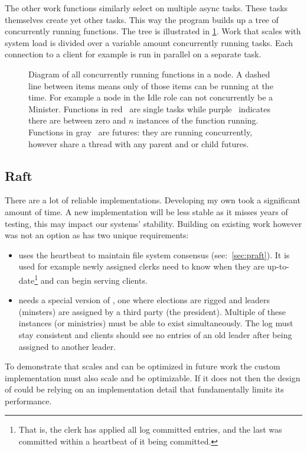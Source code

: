 The other work functions similarly select on multiple async tasks. These tasks themselves create yet other tasks. This way the program builds up a tree of concurrently running functions. The tree is illustrated in \cref{fig:tree}. Work that scales with system load is divided over a variable amount concurrently running tasks. Each connection to a client for example is run in parallel on a separate task.
%
\clearpage
\thispagestyle{empty}
\begin{figure}[htbp]
	\centering
	
	\caption{Diagram of all concurrently running functions in a node. A dashed line between items means only of those items can be running at the time. For example a node in the Idle role can not concurrently be a Minister. Functions in red~\taskLeg{} are single tasks while purple~\tasksLeg{} indicates there are between zero and $n$ instances of the function running. Functions in gray~\futureLeg{} are futures: they are running concurrently, however share a thread with any parent and or child futures.}
	\label{fig:tree}
\end{figure}
\clearpage

\subsection{Raft}
There are a lot of reliable \raft{} implementations. Developing my own took a significant amount of time. A new implementation will be less stable as it misses years of testing, this may impact our systems' stability. Building on existing work however was not an option as \name{} has two unique requirements: 
%
\begin{itemize}
	\item \Name{} uses the \raft{} heartbeat to maintain file system consensus (see:~\cref{sec:praft}). It is used for example newly assigned clerks need to know when they are up-to-date\footnote{That is, the clerk has applied all log committed entries, and the last was committed within a \raft{} heartbeat of it being committed.} and can begin serving clients. 
	\item \Name{} needs a special version of \raft{}, one where elections are rigged and leaders (minsters) are assigned by a third party (the president). Multiple of these instances (or ministries) must be able to exist simultaneously. The log must stay consistent and clients should see no entries of an old leader after being assigned to another leader. 
\end{itemize}
%
To demonstrate that \name{} scales and can be optimized in future work %
the custom implementation must also scale and be optimizable. If it does not then the design of \name{} could be relying on an implementation detail that fundamentally limits its performance.
%
